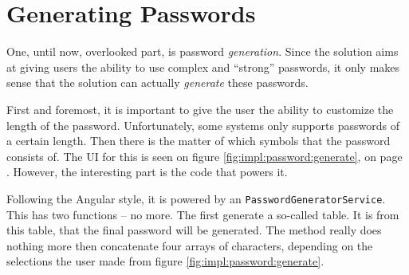 




	\section{Generating Passwords}
		One, until now, overlooked part, is password \emph{generation}. Since the solution aims at giving users the ability to use complex and ``strong'' passwords, it only makes sense that the solution can actually \emph{generate} these passwords.

		First and foremost, it is important to give the user the ability to customize the length of the password. Unfortunately, some systems only supports passwords of a certain length. Then there is the matter of which symbols that the password consists of. The UI for this is seen on figure \ref{fig:impl:password:generate}, on page \pageref{fig:impl:password:generate}. However, the interesting part is the code that powers it.

		Following the Angular style, it is powered by an \verb=PasswordGeneratorService=. This has two functions -- no more. The first generate a so-called table. It is from this table, that the final password will be generated. The method really does nothing more then concatenate four arrays of characters, depending on the selections the user made from figure \ref{fig:impl:password:generate}.

